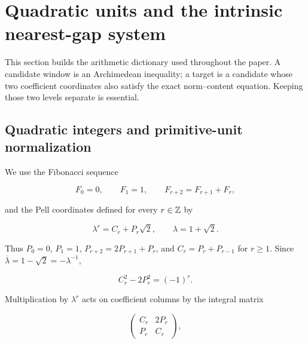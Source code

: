 %
%
\section{Quadratic units and the intrinsic nearest-gap system}
\label{sec:system}

This section builds the arithmetic dictionary used throughout the paper. A
candidate window is an Archimedean inequality; a target is a candidate whose
two coefficient coordinates also satisfy the exact norm--content equation.
Keeping those two levels separate is essential.

\subsection{Quadratic integers and primitive-unit normalization}

We use the Fibonacci sequence

\begin{equation}
 F_0=0,
 \qquad
 F_1=1,
 \qquad
 F_{r+2}=F_{r+1}+F_r,
 \label{eq:fibonacci}
\end{equation}

and the Pell coordinates defined for every $r\in\mathbb{Z}$ by

\begin{equation}
 \lambda^r=C_r+P_r\sqrt2,
 \qquad
 \lambda=1+\sqrt2.
 \label{eq:pell-coordinates}
\end{equation}

Thus $P_0=0$, $P_1=1$, $P_{r+2}=2P_{r+1}+P_r$, and
$C_r=P_r+P_{r-1}$ for $r\geqslant1$. Since
$\overline\lambda=1-\sqrt2=-\lambda^{-1}$,

\begin{equation}
 C_r^2-2P_r^2=(-1)^r.
 \label{eq:pell-norm}
\end{equation}

Multiplication by $\lambda^r$ acts on coefficient columns by the integral
matrix

\begin{equation}
 \begin{pmatrix}C_r&2P_r\\ P_r&C_r\end{pmatrix},
 \label{eq:unit-matrix}
\end{equation}

